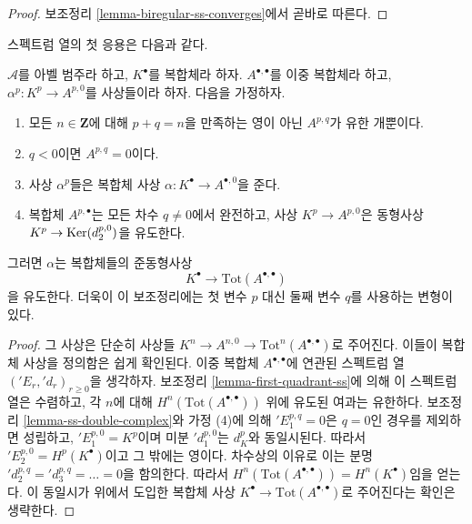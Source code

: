 \begin{proof}
보조정리 \ref{lemma-biregular-ss-converges}에서 곧바로 따른다.
\end{proof}

\noindent
스펙트럼 열의 첫 응용은 다음과 같다.

\begin{lemma}
\label{lemma-double-complex-gives-resolution}
$\mathcal{A}$를 아벨 범주라 하고, $K^\bullet$를 복합체라 하자.
$A^{\bullet, \bullet}$를 이중 복합체라 하고,
$\alpha^p : K^p \to A^{p, 0}$를 사상들이라 하자. 다음을 가정하자.
\begin{enumerate}
\item 모든 $n \in \mathbf{Z}$에 대해 $p + q = n$을 만족하는 영이 아닌
$A^{p, q}$가 유한 개뿐이다.
\item $q < 0$이면 $A^{p, q} = 0$이다.
\item 사상 $\alpha^p$들은 복합체 사상
$\alpha : K^\bullet \to A^{\bullet, 0}$을 준다.
\item 복합체 $A^{p, \bullet}$는 모든 차수 $q \not = 0$에서 완전하고,
사상 $K^p \to A^{p, 0}$은 동형사상
$K^p \to \mathop{\mathrm{Ker}}(d_2^{p, 0})$을 유도한다.
\end{enumerate}
그러면 $\alpha$는 복합체들의 준동형사상
$$
K^\bullet \longrightarrow \text{Tot}(A^{\bullet, \bullet})
$$
을 유도한다. 더욱이 이 보조정리에는 첫 변수 $p$ 대신 둘째 변수 $q$를
사용하는 변형이 있다.
\end{lemma}

\begin{proof}
그 사상은 단순히 사상들
$K^n \to A^{n, 0} \to \text{Tot}^n(A^{\bullet, \bullet})$로 주어진다.
이들이 복합체 사상을 정의함은 쉽게 확인된다. 이중 복합체
$A^{\bullet, \bullet}$에 연관된 스펙트럼 열
$({}'E_r, {}'d_r)_{r \geq 0}$을 생각하자. 보조정리
\ref{lemma-first-quadrant-ss}에 의해 이 스펙트럼 열은 수렴하고, 각
$n$에 대해 $H^n(\text{Tot}(A^{\bullet, \bullet}))$ 위에 유도된 여과는
유한하다. 보조정리 \ref{lemma-ss-double-complex}와 가정 (4)에 의해
${}'E_1^{p, q} = 0$은 $q = 0$인 경우를 제외하면 성립하고,
$'E_1^{p, 0} = K^p$이며 미분 ${}'d_1^{p, 0}$는 $d_K^p$와 동일시된다.
따라서 ${}'E_2^{p, 0} = H^p(K^\bullet)$이고 그 밖에는 영이다. 차수상의
이유로 이는 분명
${}'d_2^{p, q} = {}'d_3^{p, q} = \ldots = 0$을 함의한다. 따라서
$H^n(\text{Tot}(A^{\bullet, \bullet})) = H^n(K^\bullet)$임을 얻는다.
이 동일시가 위에서 도입한 복합체 사상
$K^\bullet \to \text{Tot}(A^{\bullet, \bullet})$로 주어진다는 확인은
생략한다.
\end{proof}

